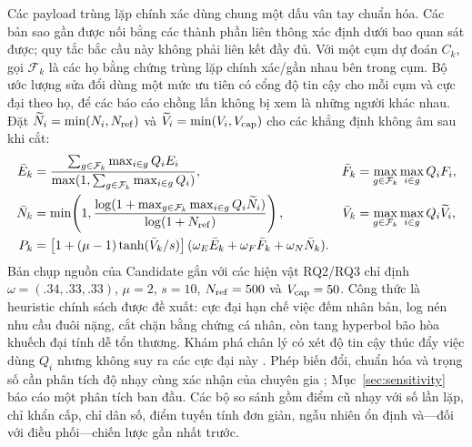 \documentclass[runningheads]{llncs}
\newcounter{algline}%
\newenvironment{algorithmic}[1][1]{%
    \setcounter{algline}{0}%
    \begin{list}{}{\setlength{\leftmargin}{3.2em}\setlength{\labelwidth}{2.4em}%
      \setlength{\labelsep}{0.6em}\setlength{\itemsep}{0.15ex}\setlength{\parsep}{0pt}%
      \setlength{\topsep}{0.2ex}}\small\normalfont}{\end{list}}%
\newcommand{\algitem}{\stepcounter{algline}%
    \item[{\makebox[2.4em][r]{\thealgline:}}]}%
\newcommand{\State}{\algitem}%
\newcommand{\Function}[2]{\algitem\textbf{hàm}~\textproc{##1}(##2)}%
\newcommand{\EndFunction}{\algitem\textbf{kết thúc hàm}}%
\newcommand{\Return}{\textbf{trả về}~}%
\newcommand{\Comment}[1]{\hfill{\footnotesize\(\triangleright\)~##1}}%
\providecommand{\textproc}[1]{\textsc{##1}}%
\begin{document}
Các payload trùng lặp chính xác dùng chung một dấu vân tay chuẩn hóa. Các
bản sao gần được nối bằng các thành phần liên thông xác định dưới bao quan
sát được; quy tắc bắc cầu này không phải liên kết đầy đủ. Với một cụm dự
đoán $C_k$, gọi $\mathcal F_k$ là các họ bằng chứng trùng lặp chính xác/gần
nhau bên trong cụm. Bộ ước lượng sửa đổi dùng một mức ưu tiên có cổng độ tin
cậy cho mỗi cụm và cực đại theo họ, để các báo cáo chồng lấn không bị xem là
những người khác nhau. Đặt
$\widetilde N_i=\min(N_i,N_{\rm ref})$ và
$\widetilde V_i=\min(V_i,V_{\rm cap})$ cho các khẳng định không âm sau khi
cắt:
\begin{align}
\bar E_k&=\frac{\sum_{g\in\mathcal F_k}\max_{i\in g}Q_iE_i}
 {\max(1,\sum_{g\in\mathcal F_k}\max_{i\in g}Q_i)},&
\bar F_k&=\max_{g\in\mathcal F_k}\max_{i\in g}Q_iF_i,\nonumber\\
\bar N_k&=\min\!\left(1,\frac{\log(1+\max_{g\in\mathcal F_k}\max_{i\in g}Q_i\widetilde N_i)}
 {\log(1+N_{\rm ref})}\right),&
\bar V_k&=\max_{g\in\mathcal F_k}\max_{i\in g}Q_i\widetilde V_i,\nonumber\\
P_k&=\left[1+(\mu-1)\tanh(\bar V_k/s)\right]
 (\omega_E\bar E_k+\omega_F\bar F_k+\omega_N\bar N_k).
\label{eq:priority}
\end{align}
Bản chụp nguồn của Candidate gắn với các hiện vật RQ2/RQ3 chỉ định
$\omega=(.34,.33,.33)$, $\mu=2$, $s=10$, $N_{\rm ref}=500$ và
$V_{\rm cap}=50$. Công thức là heuristic chính sách được đề xuất: cực đại
hạn chế việc đếm nhân bản, log nén nhu cầu đuôi nặng, cắt chặn bằng chứng cá
nhân, còn tang hyperbol bão hòa khuếch đại tính dễ tổn thương. Khám phá chân
lý có xét độ tin cậy thúc đẩy việc dùng $Q_i$ nhưng không suy ra các cực đại
này \cite{wang2012truth}. Phép biến đổi, chuẩn hóa và trọng số cần phân tích
độ nhạy cùng xác nhận của chuyên gia
\cite{tate2012vulnerability,gralla2014review}; Mục~\ref{sec:sensitivity}
báo cáo một phân tích ban đầu. Các bộ so sánh gồm điểm cũ nhạy với số lần
lặp, chỉ khẩn cấp, chỉ dân số, điểm tuyến tính đơn giản, ngẫu nhiên ổn định
và---đối với điều phối---chiến lược gần nhất trước.

\end{document}

